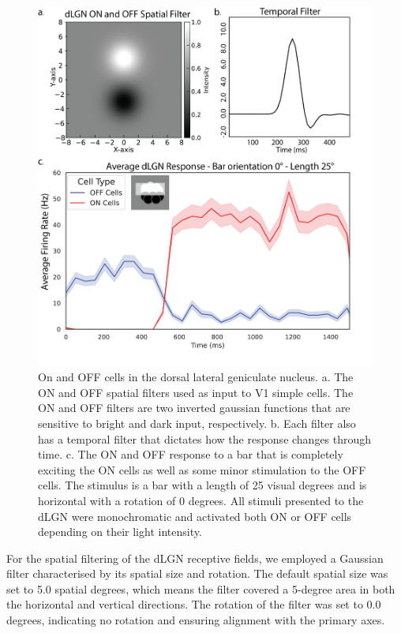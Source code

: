\documentclass[12pt]{article}
\begin{document}
\begin{figure}[H]
  \centering
  \includegraphics[width=1.0 \textwidth]{adjusted_figures/lgn_response_fig.png}
  \caption{On and OFF cells in the dorsal lateral geniculate nucleus. a. The ON and OFF spatial filters used as input to V1 simple cells. The ON and OFF filters are two inverted gaussian functions that are sensitive to bright and dark input, respectively. b. Each filter also has a temporal filter that dictates how the response changes through time. c. The ON and OFF response to a bar that is completely exciting the ON cells as well as some minor stimulation to the OFF cells. The stimulus is a bar with a length of 25 visual degrees and is horizontal with a rotation of 0 degrees. All stimuli presented to the dLGN were monochromatic and activated both ON or OFF cells depending on their light intensity.}
  \label{fig:LIF_connectivity}
\end{figure}

For the spatial filtering of the dLGN receptive fields, we employed a Gaussian filter characterised by its spatial size and rotation. The default spatial size was set to 5.0 spatial degrees, which means the filter covered a 5-degree area in both the horizontal and vertical directions. The rotation of the filter was set to 0.0 degrees, indicating no rotation and ensuring alignment with the primary axes.
\end{document}
